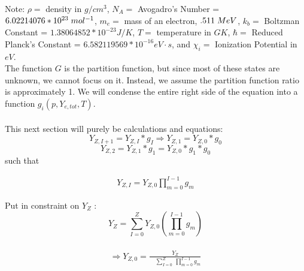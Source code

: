 \documentclass[11pt,a4paper]{article}
\begin{document}
Note: $\rho = $ density in $g/cm^3$, $N_A = $ Avogadro's Number = \hfill$6.02214076*10^{23} \hspace{.1 cm} mol^{-1}$, $m_e = $ mass of an electron, $.511 \hspace{.1 cm} MeV$, $k_b = $ Boltzman Constant = $1.38064852 * 10^{-23} J/K$, $T = $ temperature in $GK$, $\hbar = $ Reduced Planck's Constant = $6.582119569 * 10^{-16} eV \cdot s$, and $\chi_i = $ Ionization Potential in $eV$.\\
 

The function $G$ is the partition function, but since most of these states are unknown, we cannot focus on it. Instead, we assume the partition function ratio is approximately 1. We will condense the entire right side of the equation into a function $g_i (p,Y_{e,tot},T) $.
\\\\
This next section will purely be calculations and equations: $$ Y_{Z,I+1} = Y_{Z,I} * g_I \Longrightarrow  Y_{Z,1} = Y_{Z,0}*g_0 $$   $$ Y_{Z,2} = Y_{Z,1}*g_1 = Y_{Z,0}*g_1 * g_0 $$
such that 

\begin{align} 
Y_{Z,I} = Y_{Z,0} \prod_{m=0}^{I - 1} g_m 
\end{align}

Put in constraint on $Y_Z$ : $$ Y_Z = \sum_{I=0}^{Z} Y_{Z,0} \left(\prod_{m=0}^{I - 1} g_m\right) $$\\
\begin{align} 
\Longrightarrow Y_{Z,0} = \frac{Y_Z}{\quad \displaystyle \sum_{I=0}^{Z} \medspace \prod_{m=0}^{I - 1} g_m}
\end{align}
\end{document}

